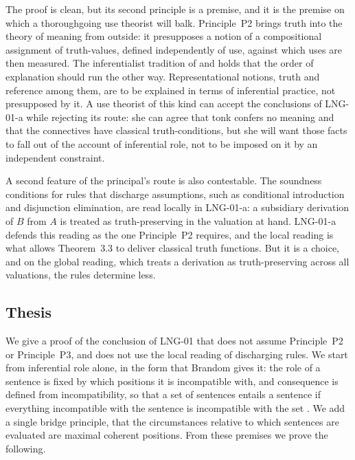 \documentclass{situationist-preprint}
\begin{document}
The proof is clean, but its second principle is a premise, and it is the premise on which a thoroughgoing use theorist will balk. Principle~P2 brings truth into the theory of meaning from outside: it presupposes a notion of a compositional assignment of truth-values, defined independently of use, against which uses are then measured. The inferentialist tradition of \citet{Sellars1953,Sellars1954} and \citet{Brandom1994,Brandom2000} holds that the order of explanation should run the other way. Representational notions, truth and reference among them, are to be explained in terms of inferential practice, not presupposed by it. A use theorist of this kind can accept the conclusions of LNG-01-a while rejecting its route: she can agree that tonk confers no meaning and that the connectives have classical truth-conditions, but she will want those facts to fall out of the account of inferential role, not to be imposed on it by an independent constraint.

A second feature of the principal's route is also contestable. The soundness conditions for rules that discharge assumptions, such as conditional introduction and disjunction elimination, are read locally in LNG-01-a: a subsidiary derivation of $B$ from $A$ is treated as truth-preserving in the valuation at hand. LNG-01-a defends this reading as the one Principle~P2 requires, and the local reading is what allows Theorem~3.3 to deliver classical truth functions. But it is a choice, and on the global reading, which treats a derivation as truth-preserving across all valuations, the rules determine less.

\subsection{Thesis}

We give a proof of the conclusion of LNG-01 that does not assume Principle~P2 or Principle~P3, and does not use the local reading of discharging rules. We start from inferential role alone, in the form that Brandom gives it: the role of a sentence is fixed by which positions it is incompatible with, and consequence is defined from incompatibility, so that a set of sentences entails a sentence if everything incompatible with the sentence is incompatible with the set \citep[ch.~5]{Brandom2008}. We add a single bridge principle, that the circumstances relative to which sentences are evaluated are maximal coherent positions. From these premises we prove the following.
\end{document}
